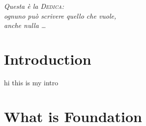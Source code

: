 \documentclass[12pt,a4paper,openright,twoside]{report}
\numberwithin{equation}{section}
\begin{document}
 



\begin{titlepage} 
\thispagestyle{empty}                   %
\topmargin=6.5cm                        %
\raggedleft                             %
\large                                  %
\em                                     %
Questa è la \textsc{Dedica}:\\
ognuno può scrivere quello che vuole, \\
anche nulla \ldots                   
\newpage                               
\end{titlepage}




\chapter*{Introduction}             


hi this is my intro


\clearpage{\pagestyle{empty}\cleardoublepage}
\tableofcontents      
\clearpage{\pagestyle{empty}\cleardoublepage}
\listoffigures                         
\clearpage{\pagestyle{empty}\cleardoublepage}
\listoftables  
\clearpage{\pagestyle{empty}\cleardoublepage}




\chapter{What is Foundation}

\end{document}
